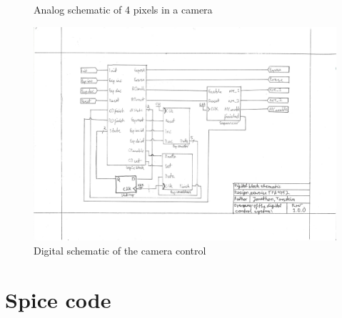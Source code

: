 \documentclass[a4paper, 12pt, english]{article}
\begin{document}
\begin{appendices}
\begin{figure}[H]
    \caption{Analog schematic of 4 pixels in a camera}
    \label{fig:analogCamera}
  \end{figure}
  \begin{figure}[H]
    \centering
    \includegraphics[angle=-90, scale=0.73]{figures/SchematicDigital}
    \caption{Digital schematic of the camera control}
    \label{fig:digitalControl}
  \end{figure}

  \newpage
  
  \section{Spice code} \label{ap:SpiceCode}
   \label{lst:cameratoplevel}
  
  
  
  
  
  
  \newpage
  

\end{appendices}
\end{document}
